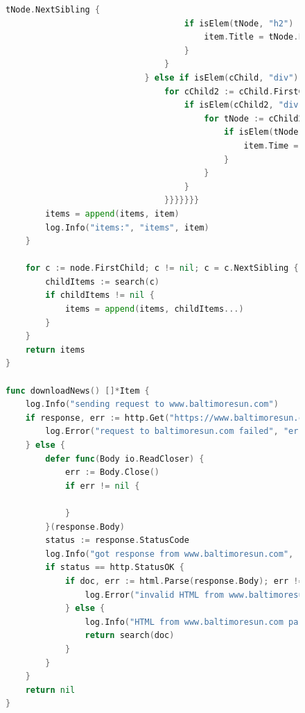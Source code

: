 \documentclass[a4paper, 14pt]{extarticle}
\begin{document}
\newpage

\begin{figure}[!htb]
\begin{lstlisting}[language={Go},caption={download.go - продолжение},label={lst:code2}]
tNode.NextSibling {
									if isElem(tNode, "h2") || isElem(tNode, "h1") {
										item.Title = tNode.FirstChild.Data
									}
								}
							} else if isElem(cChild, "div") && getAttr(cChild, "class") == "isDisabled" {
								for cChild2 := cChild.FirstChild; cChild2 != nil; cChild2 = cChild2.NextSibling {
									if isElem(cChild2, "div") && getAttr(cChild2, "class") == "padding-xs-top" {
										for tNode := cChild2.FirstChild; tNode != nil; tNode = tNode.NextSibling {
											if isElem(tNode, "time") {
												item.Time = getAttr(tNode, "datetime")
											}
										}
									}
								}}}}}}}
		items = append(items, item)
		log.Info("items:", "items", item)
	}

	for c := node.FirstChild; c != nil; c = c.NextSibling {
		childItems := search(c)
		if childItems != nil {
			items = append(items, childItems...)
		}
	}
	return items
}

func downloadNews() []*Item {
	log.Info("sending request to www.baltimoresun.com")
	if response, err := http.Get("https://www.baltimoresun.com/latest/"); err != nil {
		log.Error("request to baltimoresun.com failed", "error", err)
	} else {
		defer func(Body io.ReadCloser) {
			err := Body.Close()
			if err != nil {

			}
		}(response.Body)
		status := response.StatusCode
		log.Info("got response from www.baltimoresun.com", "status", status)
		if status == http.StatusOK {
			if doc, err := html.Parse(response.Body); err != nil {
				log.Error("invalid HTML from www.baltimoresun.com", "error", err)
			} else {
				log.Info("HTML from www.baltimoresun.com parsed successfully")
				return search(doc)
			}
		}
	}
	return nil
}
\end{lstlisting}
\end{figure}
\end{document}
